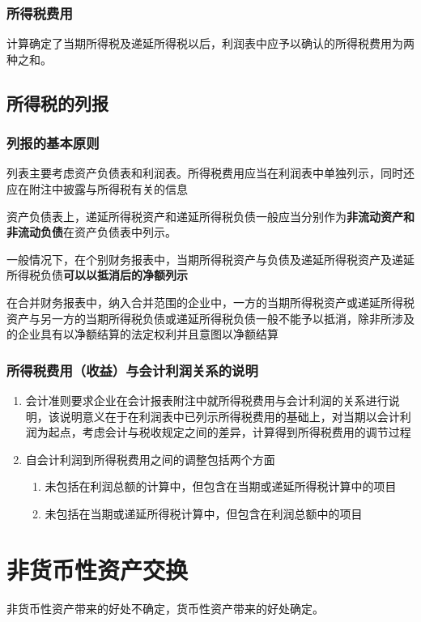 \documentclass[UTF8,12pt]{ctexart}
\numberwithin{equation}{section} %
\numberwithin{figure}{section}
\numberwithin{table}{section}
\begin{document}
	\subsubsection{所得税费用}
	计算确定了当期所得税及递延所得税以后，利润表中应予以确认的所得税费用为两种之和。
	
	\subsection{所得税的列报}
	\subsubsection{列报的基本原则}
	列表主要考虑资产负债表和利润表。所得税费用应当在利润表中单独列示，同时还应在附注中披露与所得税有关的信息
	
	资产负债表上，递延所得税资产和递延所得税负债一般应当分别作为\textbf{非流动资产和非流动负债}在资产负债表中列示。
	
	一般情况下，在个别财务报表中，当期所得税资产与负债及递延所得税资产及递延所得税负债\textbf{可以以抵消后的净额列示}
	
	在合并财务报表中，纳入合并范围的企业中，一方的当期所得税资产或递延所得税资产与另一方的当期所得税负债或递延所得税负债一般不能予以抵消，除非所涉及的企业具有以净额结算的法定权利并且意图以净额结算
	
	\subsubsection{所得税费用（收益）与会计利润关系的说明}
	\begin{enumerate}
		\item 会计准则要求企业在会计报表附注中就所得税费用与会计利润的关系进行说明，该说明意义在于在利润表中已列示所得税费用的基础上，对当期以会计利润为起点，考虑会计与税收规定之间的差异，计算得到所得税费用的调节过程
		
		\item 自会计利润到所得税费用之间的调整包括两个方面
		\begin{enumerate}
			\item 未包括在利润总额的计算中，但包含在当期或递延所得税计算中的项目
			
			\item 未包括在当期或递延所得税计算中，但包含在利润总额中的项目
		\end{enumerate}
	\end{enumerate}
	
	\newpage
	\section{非货币性资产交换}
	非货币性资产带来的好处不确定，货币性资产带来的好处确定。
\end{document}
